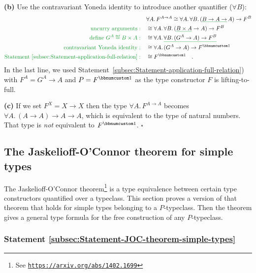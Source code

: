 \textbf{(b)} Use the contravariant Yoneda identity to introduce another
quantifier ($\forall B$):
\begin{align*}
 & \forall A.\,F^{A\rightarrow A}\cong\forall A.\,\forall B.\,(\gunderline{B\rightarrow A\rightarrow}\,A)\rightarrow F^{B}\\
{\color{greenunder}\text{uncurry arguments}:}\quad & \cong\forall A.\,\forall B.\,(\gunderline{B\times A}\rightarrow A)\rightarrow F^{B}\\
{\color{greenunder}\text{define }G^{A}\triangleq B\times A:}\quad & \cong\forall A.\,\gunderline{\forall B.\,(G^{A}\rightarrow A)\rightarrow F^{B}}\\
{\color{greenunder}\text{contravariant Yoneda identity}:}\quad & \cong\forall A.\,(G^{A}\rightarrow A)\rightarrow F^{\bbnum 1}\\
{\color{greenunder}\text{Statement \ref{subsec:Statement-application-full-relation}}:}\quad & \cong F^{\bbnum 1}\quad.
\end{align*}
In the last line, we used Statement~\ref{subsec:Statement-application-full-relation})
with $F^{A}=G^{A}\rightarrow A$ and $P=F^{\bbnum 1}$ as the type
constructor $F$ is lifting-to-full.

\textbf{(c)} If we set $F^{X}=X\rightarrow X$ then the type $\forall A.\,F^{A\rightarrow A}$
becomes $\forall A.\,(A\rightarrow A)\rightarrow A\rightarrow A$,
which is equivalent to the type of natural numbers. That type is \emph{not}
equivalent to $F^{\bbnum 1}$. $\square$

\subsection{The Jaskelioff-O\textsf{'}Connor theorem for simple types}

The Jaskelioff-O\textsf{'}Connor theorem\footnote{See \texttt{\href{https://arxiv.org/abs/1402.1699}{https://arxiv.org/abs/1402.1699}}}
is a type equivalence between certain type constructors quantified
over a typeclass. This section proves a version of that theorem that
holds for simple types belonging to a $P$-typeclass. Then the theorem
gives a general type formula for the free construction of any $P$-typeclass.

\subsubsection{Statement \label{subsec:Statement-JOC-theorem-simple-types}\ref{subsec:Statement-JOC-theorem-simple-types}}


